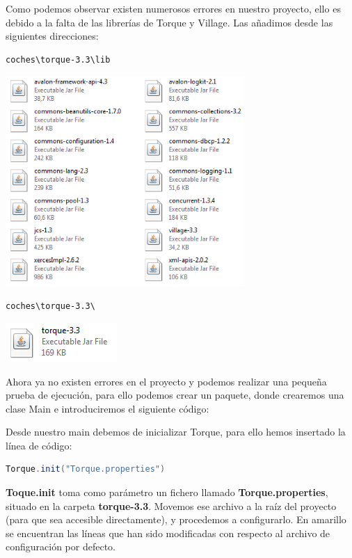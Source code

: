 Como podemos observar existen numerosos errores en nuestro proyecto, ello es debido a la falta de las librerías de Torque y Village. Las añadimos desde las siguientes direcciones:

\begin{lstlisting}
coches\torque-3.3\lib
\end{lstlisting}

\begin{center}
	\includegraphics[height=8cm]{img/torque-lib.png}
\end{center}

\begin{lstlisting}
coches\torque-3.3\
\end{lstlisting}

\begin{center}
	\includegraphics{img/torque-file.png}
\end{center}

Ahora ya no existen errores en el proyecto y podemos realizar una pequeña prueba de ejecución, para ello podemos crear un paquete, donde crearemos una clase Main e introduciremos el siguiente código:



Desde nuestro main debemos de inicializar Torque, para ello hemos insertado la línea de código: 

\begin{lstlisting}[language=java]
Torque.init("Torque.properties")
\end{lstlisting}

{\bf Toque.init} toma como parámetro un fichero llamado {\bf Torque.properties}, situado en la carpeta {\bf torque-3.3}. Movemos ese archivo a la raíz del proyecto (para que sea accesible directamente), y procedemos a configurarlo. En amarillo se encuentran las líneas que han sido modificadas con respecto al archivo de configuración por defecto.

